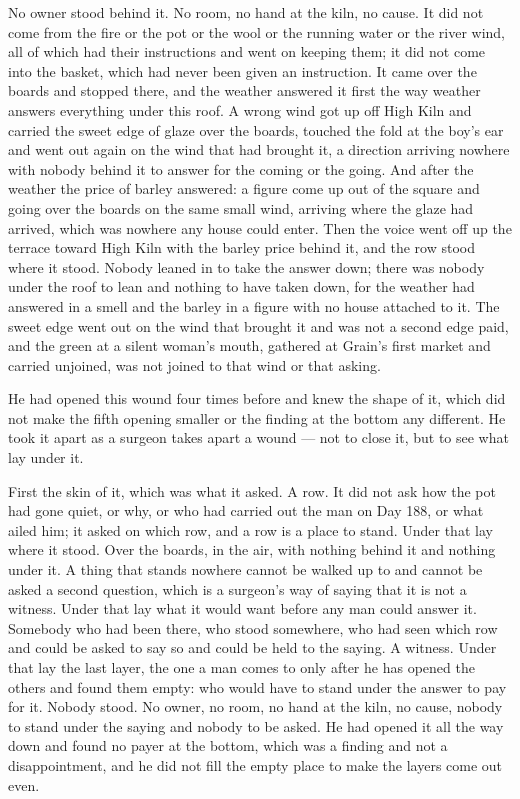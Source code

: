 No owner stood behind it. No room, no hand at the kiln, no cause. It did not come from the fire or the pot or the wool or the running water or the river wind, all of which had their instructions and went on keeping them; it did not come into the basket, which had never been given an instruction. It came over the boards and stopped there, and the weather answered it first the way weather answers everything under this roof. A wrong wind got up off High Kiln and carried the sweet edge of glaze over the boards, touched the fold at the boy's ear and went out again on the wind that had brought it, a direction arriving nowhere with nobody behind it to answer for the coming or the going. And after the weather the price of barley answered: a figure come up out of the square and going over the boards on the same small wind, arriving where the glaze had arrived, which was nowhere any house could enter. Then the voice went off up the terrace toward High Kiln with the barley price behind it, and the row stood where it stood. Nobody leaned in to take the answer down; there was nobody under the roof to lean and nothing to have taken down, for the weather had answered in a smell and the barley in a figure with no house attached to it. The sweet edge went out on the wind that brought it and was not a second edge paid, and the green at a silent woman's mouth, gathered at Grain's first market and carried unjoined, was not joined to that wind or that asking.

He had opened this wound four times before and knew the shape of it, which did not make the fifth opening smaller or the finding at the bottom any different. He took it apart as a surgeon takes apart a wound --- not to close it, but to see what lay under it.

First the skin of it, which was what it asked. A row. It did not ask how the pot had gone quiet, or why, or who had carried out the man on Day 188, or what ailed him; it asked on which row, and a row is a place to stand. Under that lay where it stood. Over the boards, in the air, with nothing behind it and nothing under it. A thing that stands nowhere cannot be walked up to and cannot be asked a second question, which is a surgeon's way of saying that it is not a witness. Under that lay what it would want before any man could answer it. Somebody who had been there, who stood somewhere, who had seen which row and could be asked to say so and could be held to the saying. A witness. Under that lay the last layer, the one a man comes to only after he has opened the others and found them empty: who would have to stand under the answer to pay for it. Nobody stood. No owner, no room, no hand at the kiln, no cause, nobody to stand under the saying and nobody to be asked. He had opened it all the way down and found no payer at the bottom, which was a finding and not a disappointment, and he did not fill the empty place to make the layers come out even.


